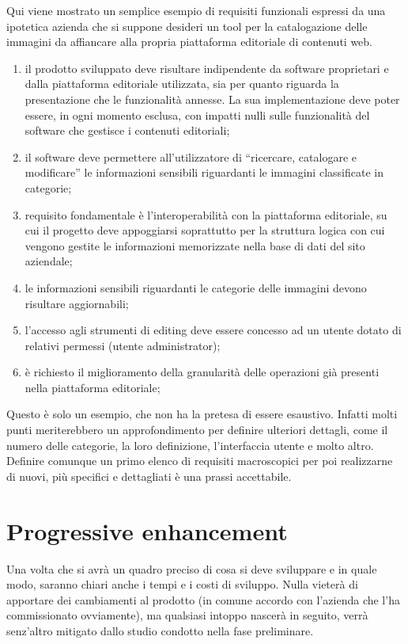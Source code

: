 Qui viene mostrato un semplice esempio di requisiti funzionali espressi da una ipotetica azienda che si suppone desideri un tool per la catalogazione delle immagini da affiancare alla propria piattaforma editoriale di contenuti web.

\begin{enumerate}
\item il prodotto sviluppato deve risultare indipendente da software proprietari e dalla piattaforma editoriale utilizzata, sia per quanto riguarda la presentazione che le funzionalità annesse. La sua implementazione deve poter essere, in ogni momento esclusa, con impatti nulli sulle funzionalità del software che gestisce i contenuti editoriali;
\item il software deve permettere all'utilizzatore di ``ricercare, catalogare e modificare'' le informazioni sensibili riguardanti le immagini classificate in categorie;
\item requisito fondamentale è l'interoperabilità con la piattaforma editoriale, su cui il progetto deve appoggiarsi soprattutto per la struttura logica con cui vengono gestite le informazioni memorizzate nella base di dati del sito aziendale; 
\item le informazioni sensibili riguardanti le categorie delle immagini devono risultare aggiornabili;
\item l'accesso agli strumenti di editing deve essere concesso ad un utente dotato di relativi permessi (utente administrator);
\item è richiesto il miglioramento della granularità delle operazioni già presenti nella piattaforma editoriale; 
\end{enumerate}

Questo è solo un esempio, che non ha la pretesa di essere esaustivo. Infatti molti punti meriterebbero un approfondimento per definire ulteriori dettagli, come il numero delle categorie, la loro definizione, l'interfaccia utente e molto altro. Definire comunque un primo elenco di requisiti macroscopici per poi realizzarne di nuovi, più specifici e dettagliati è una prassi accettabile.

\section*{Progressive enhancement}
Una volta che si avrà un quadro preciso di cosa si deve sviluppare e in quale modo, saranno chiari anche i tempi e i costi di sviluppo. Nulla vieterà di apportare dei cambiamenti al prodotto (in comune accordo con l'azienda che l'ha commissionato ovviamente), ma qualsiasi intoppo nascerà in seguito, verrà senz'altro mitigato dallo studio condotto nella fase preliminare.

